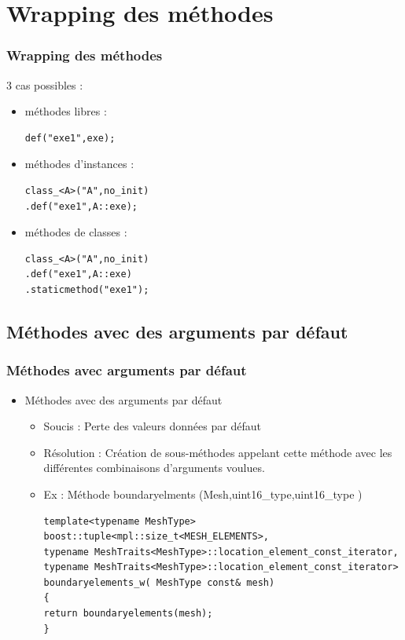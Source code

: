 \documentclass[french,10pt]{beamer}
\begin{document}
\section{Wrapping des méthodes}
\begin{frame}[fragile]
\frametitle{Wrapping des méthodes}
3 cas possibles :
\begin{itemize}
\item méthodes libres :
\begin{lstlisting}
def("exe1",exe);
\end{lstlisting}
\item méthodes d'instances :
\begin{lstlisting}
class_<A>("A",no_init)
.def("exe1",A::exe);
\end{lstlisting}
\item méthodes de classes :
\begin{lstlisting}
class_<A>("A",no_init)
.def("exe1",A::exe)
.staticmethod("exe1");
\end{lstlisting}
\end{itemize}
\end{frame}

\subsection{Méthodes avec des arguments par défaut}
\begin{frame}[fragile]
\frametitle{Méthodes avec arguments par défaut}
\begin{itemize}
\item Méthodes avec des arguments par défaut
\begin{itemize}
\item Soucis : Perte des valeurs données par défaut
\item Résolution : Création de sous-méthodes appelant cette méthode avec les différentes combinaisons d'arguments voulues.
\item Ex : Méthode boundaryelments (Mesh,uint16\_type,uint16\_type )
\begin{lstlisting}
template<typename MeshType>
boost::tuple<mpl::size_t<MESH_ELEMENTS>,
typename MeshTraits<MeshType>::location_element_const_iterator,
typename MeshTraits<MeshType>::location_element_const_iterator>
boundaryelements_w( MeshType const& mesh)
{
return boundaryelements(mesh);
}
\end{lstlisting}
\end{itemize}
\end{itemize}
\end{frame}
\end{document}
